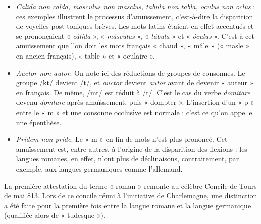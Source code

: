 \begin{itemize}
\item \textit{Calida non calda, masculus non masclus, tabula non tabla, oculus non oclus} : ces exemples illustrent le processus d’amuïssement, c’est-à-dire la disparition de voyelles post-toniques brèves. Les mots latins étaient en effet accentués et se prononçaient « \textit{cálida} », « \textit{másculus} », « \textit{tábula} » et « \textit{óculus} ». C’est à cet amuïssement que l’on doit les mots français « chaud », « mâle » (« masle » en ancien français), « table » et « oculaire ».
\item \textit{Auctor non autor}. On note ici des réductions de groupes de consonnes. Le groupe /kt/ devient /t/, et \textit{auctor} devient \textit{autor} avant de devenir « auteur » en français. De même, /mt/ est réduit à /t/. C’est le cas du verbe \textit{domitare} devenu \textit{domtare} après amuïssement, puis « dompter ». L’insertion d’un « p » entre le « m » et une consonne occlusive est normale :
c’est ce qu’on appelle une épenthèse.
\item \textit{Pridem non pride}. Le « m » en fin de mots n’est plus prononcé. Cet amuïssement est, entre autres, à l’origine de la disparition des flexions : les langues romanes, en effet, n’ont plus de déclinaisons, contrairement, par exemple, aux langues germaniques comme l’allemand.
\end{itemize}

La première attestation du terme « roman » remonte au célèbre Concile de Tours de mai 813. Lors de ce concile réuni à l’initiative de Charlemagne, une distinction a été faite pour la première fois entre la langue romane et la langue germanique (qualifiée alors de « tudesque »).

